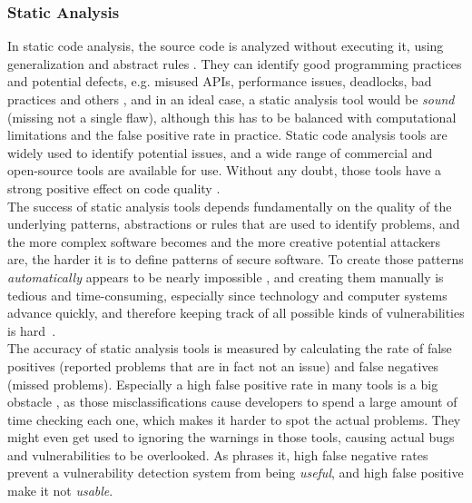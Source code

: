 \documentclass[
	a4paper,
	pagesize,
	pdftex,
	12pt,
	twoside, %
	BCOR=5mm, %
	ngerman,
	fleqn,
	final,
	]{scrartcl}
\begin{document}
\subsubsection{Static Analysis}
In static code analysis, the source code is analyzed without executing it, using generalization and abstract rules \cite{Ghaffarian.2017}. They can identify good programming practices and potential defects, e.g. misused APIs, performance issues, deadlocks, bad practices and others \cite{Venkatasubramanyam.2014}, and in an ideal case, a static analysis tool would be \textit{sound} (missing not a single flaw), although this has to be balanced with computational limitations and the false positive rate in practice. Static code analysis tools are widely used to identify potential issues, and a wide range of commercial and open-source tools are available for use. Without any doubt, those tools have a strong positive effect on code quality \cite{Liu.2018}. \\
The success of static analysis tools depends fundamentally on the quality of the underlying patterns, abstractions or rules that are used to identify problems, and the more complex software becomes and the more creative potential attackers are, the harder it is to define patterns of secure software. To create those patterns \textit{automatically} appears to be nearly impossible \cite{Rolim.2018, Yamaguchi.2012}, and creating them manually is tedious and time-consuming, especially since technology and computer systems advance quickly, and therefore keeping track of all possible kinds of vulnerabilities is hard~\cite{Ma.2017}.\\
The accuracy of static analysis tools is measured by calculating the rate of false positives (reported problems that are in fact not an issue) and false negatives (missed problems). Especially a high false positive rate in many tools is a big obstacle \cite[S.~1]{Liu.2018}, as those misclassifications cause developers to spend a large amount of time checking each one, which makes it harder to spot the actual problems. They might even get used to ignoring the warnings in those tools, causing actual bugs and vulnerabilities to be overlooked. As \cite{Li.2005} phrases it, high false negative rates prevent a vulnerability detection system from being \textit{useful}, and high false positive make it not \textit{usable}.\\
\end{document}
